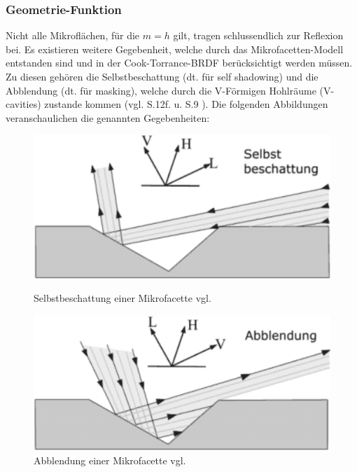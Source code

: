 \documentclass[
  11pt,
  a4paper,
  oneside
  ]{article}
\begin{document}
\subsubsection{Geometrie-Funktion}
Nicht alle Mikroflächen, für die $m = h$ gilt, tragen schlussendlich zur Reflexion bei. Es existieren weitere Gegebenheit, welche durch das Mikrofacetten-Modell entstanden sind und in der Cook-Torrance-BRDF berücksichtigt werden müssen. Zu diesen gehören die Selbstbeschattung (dt. für self shadowing) und die Abblendung (dt. für masking), welche durch die V-Förmigen Hohlräume (V-cavities) zustande kommen 
(vgl. S.12f. \cite{rtrPaper} u. S.9 \cite{irrlichtOrg}). Die folgenden Abbildungen veranschaulichen die genannten Gegebenheiten: 
\begin{figure}[H]
  \centering
  \begin{minipage}{.48\textwidth}
    \centering
    \includegraphics*[width=1\linewidth]{images/selstbeschattung.png}
    \caption{Selbstbeschattung einer Mikrofacette vgl. \cite{learnOpenGL}}
    \label{fig:img8}
  \end{minipage}%
  \hfill
  \begin{minipage}{.48\textwidth}
    \centering
    \includegraphics*[width=1\linewidth]{images/abblendung.png}
    \caption{Abblendung einer Mikrofacette vgl. \cite{learnOpenGL}}
    \label{fig:img9}
  \end{minipage}
\end{figure}
\end{document}
